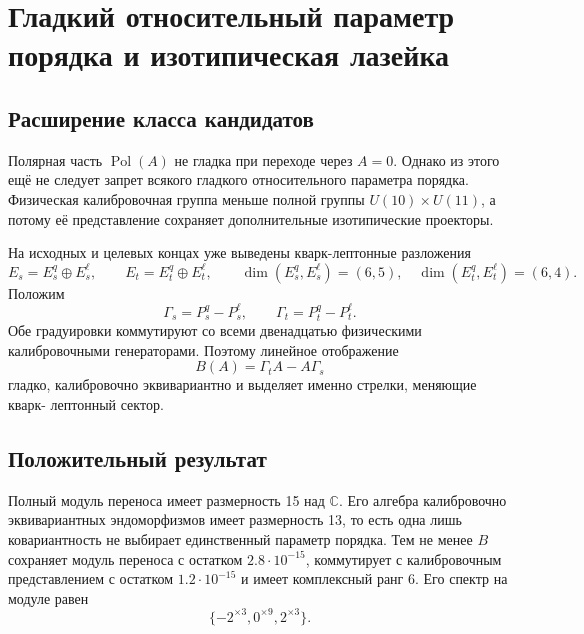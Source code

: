 \chapter{Гладкий относительный параметр порядка и изотипическая лазейка}
\label{ch:v8-smooth-relative-background-order-parameter-gate}

\section{Расширение класса кандидатов}

Полярная часть $\operatorname{Pol}(A)$ не гладка при переходе через
$A=0$. Однако из этого ещё не следует запрет всякого гладкого относительного
параметра порядка. Физическая калибровочная группа меньше полной группы
$U(10)\times U(11)$, а потому её представление сохраняет дополнительные
изотипические проекторы.

На исходных  и целевых концах уже выведены кварк-лептонные разложения
\begin{equation}
 E_s=E_s^q\oplus E_s^\ell,
 \qquad
 E_t=E_t^q\oplus E_t^\ell,
 \qquad
 \dim(E_s^q,E_s^\ell)=(6,5),
 \quad
 \dim(E_t^q,E_t^\ell)=(6,4).
 \label{eq:v8-quark-lepton-endpoint-split}
\end{equation}
Положим
\begin{equation}
 \Gamma_s=P_s^q-P_s^\ell,
 \qquad
 \Gamma_t=P_t^q-P_t^\ell.
 \label{eq:v8-endpoint-sector-gradings}
\end{equation}
Обе градуировки коммутируют со всеми двенадцатью физическими калибровочными
генераторами. Поэтому линейное отображение
\begin{equation}
 B(A)=\Gamma_tA-A\Gamma_s
 \label{eq:v8-smooth-cross-sector-order}
\end{equation}
гладко, калибровочно эквивариантно и выделяет именно стрелки, меняющие кварк-
лептонный сектор.

\section{Положительный результат}

Полный модуль переноса имеет размерность 15 над $\mathbb C$. Его алгебра
калибровочно эквивариантных эндоморфизмов имеет размерность 13, то есть одна лишь
ковариантность не выбирает единственный параметр порядка. Тем не менее
$B$ сохраняет модуль переноса с остатком $2.8\cdot10^{-15}$, коммутирует с
калибровочным представлением с остатком $1.2\cdot10^{-15}$ и имеет комплексный ранг
6. Его спектр на модуле равен
\begin{equation}
 \{-2^{\times3},0^{\times9},2^{\times3}\}.
 \label{eq:v8-smooth-order-spectrum}
\end{equation}

